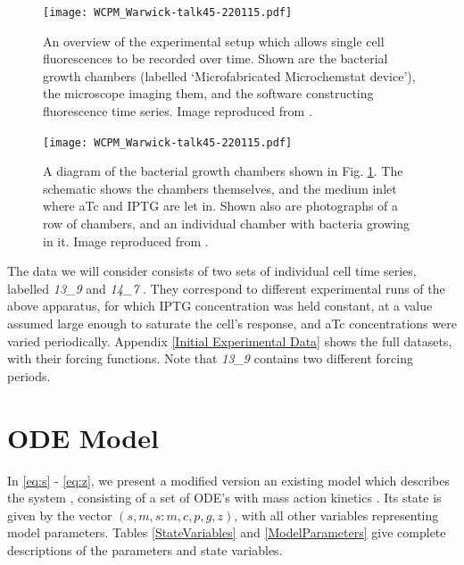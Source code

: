 \documentclass[10pt,journal]{./IEEE_latex_class/IEEEtran}
\begin{document}
\begin{figure}
    \centering
		\texttt{[image: WCPM\_Warwick-talk45-220115.pdf]}
        \caption{An overview of the experimental setup which allows single cell fluorescences to be recorded over time. Shown are the bacterial growth chambers (labelled `Microfabricated Microchemstat device'), the microscope imaging them, and the software constructing fluorescence time series. Image reproduced from \cite{Jaramillo}. }
            \label{ExperimentalSetup_overview}
\end{figure}
\begin{figure}
    \centering
	\texttt{[image: WCPM\_Warwick-talk45-220115.pdf]}
        \caption{A diagram of the bacterial growth chambers shown in Fig. \ref{ExperimentalSetup_overview}. The schematic shows the chambers themselves, and the medium inlet where aTc and IPTG are let in. Shown also are photographs of a row of chambers, and an individual chamber with bacteria growing in it. Image reproduced from \cite{Jaramillo}.}
    \label{ExperimentalSetup_chambers}
\end{figure}

The data we will consider consists of two sets of individual cell time series, labelled \textit{13\_9} and \textit{14\_7} \cite{Jaramilloa}. They correspond to different experimental runs of the above apparatus, for which IPTG concentration was held constant, at a value assumed large enough to saturate the cell's response, and aTc concentrations were varied periodically. Appendix \ref{Initial  Experimental Data} shows the full datasets, with their forcing functions. Note that \textit{13\_9} contains two different forcing periods.




\section{ODE Model}
\label{ODEModel}

In \eqref{eq:s} - \eqref{eq:z}, we present a modified version an existing model which describes the system \cite{Jaramilloa}, consisting of a set of ODE's with mass action kinetics \cite{UriAlon}.  Its state is given by the vector $(s,m,s:m,c,p,g,z)$, with all other variables representing model parameters. Tables \ref{StateVariables} and \ref{ModelParameters} give complete descriptions of the parameters and state variables.
 
\end{document}
